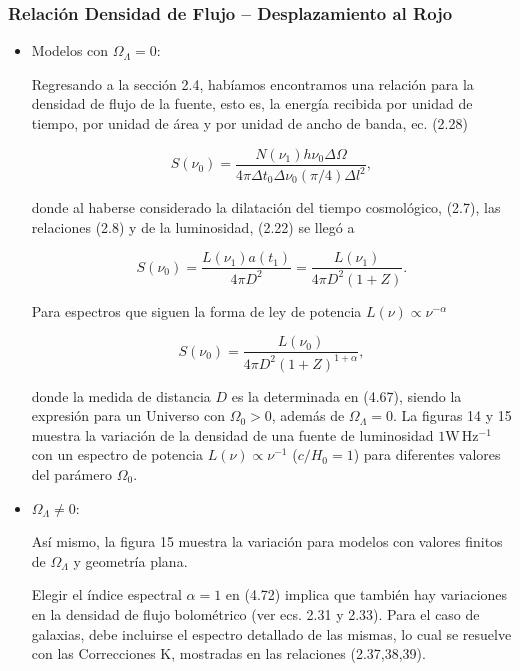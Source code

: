 \documentclass[11pt]{article}
\begin{document}
    
    \subsubsection{Relación Densidad de Flujo – Desplazamiento al Rojo}

\begin{itemize} 

\item Modelos con $\Omega_{\Lambda} =0$:

Regresando a la sección 2.4,  habíamos encontramos una relación para la densidad de flujo de la fuente, esto es, la energía recibida por unidad de tiempo, por unidad de área y por unidad de ancho de banda, ec. (2.28)

\begin{equation}
	S(\nu_0) = \frac{N(\nu_1)h \nu_0 \Delta \Omega}{4 \pi \Delta t_0 \Delta \nu_0 (\pi/4) \Delta l^2},
\end{equation}

donde al haberse considerado la dilatación del tiempo cosmológico,  (2.7), las relaciones (2.8) y de la luminosidad, (2.22) se llegó a 

\begin{equation}
	S(\nu_0) = \frac{L(\nu_1) a(t_1)}{4 \pi D^2} = \frac{L(\nu_1) }{4 \pi D^2(1+Z)}.
\end{equation}

Para espectros que siguen la forma de ley de potencia $L(\nu) \propto \nu^{-\alpha}$ 

\begin{equation}
	S(\nu_0) = \frac{L(\nu_0) }{4 \pi D^2(1+Z)^{1+\alpha}},
\end{equation}


donde la medida de distancia $D$ es la determinada en (4.67), siendo la expresión para un Universo con $\Omega_0 > 0$, además de $\Omega_{\Lambda} =0$. La figuras 14 y 15 muestra la variación de la densidad de una fuente de luminosidad $1 \mathrm{W \, Hz^{-1}}$ con un espectro de potencia $L(\nu) \propto \nu^{-1}$ ($c/H_0 =1$)  para diferentes valores del parámero $\Omega_0$. 



\item $\Omega_{\Lambda} \neq 0$:

Así mismo, la figura 15 muestra la variación para modelos con valores finitos de $\Omega_{\Lambda}$ y geometría plana. 

Elegir el índice espectral $\alpha = 1$  en (4.72) implica que también hay variaciones en la densidad de flujo bolométrico (ver ecs. 2.31 y 2.33). Para el caso de galaxias, debe incluirse el espectro detallado de las mismas, lo cual se resuelve con las Correcciones K, mostradas en las relaciones (2.37,38,39). 

\end{itemize}
\end{document}
